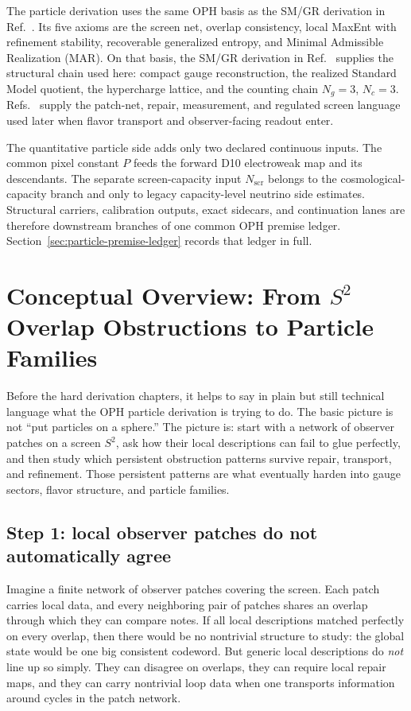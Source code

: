 \documentclass[11pt]{article}
\begin{document}
The particle derivation uses the same OPH basis as the SM/GR derivation in Ref.~\cite{ophcompact}. Its five
axioms are the screen net, overlap consistency, local MaxEnt with refinement stability,
recoverable generalized entropy, and Minimal Admissible Realization (MAR). On that basis, the
SM/GR derivation in Ref.~\cite{ophcompact} supplies the structural chain used here: compact gauge reconstruction, the realized
Standard Model quotient, the hypercharge lattice, and the counting chain \(N_g=3\), \(N_c=3\).
Refs.~\cite{ophconsensus,ophmicrophysics} supply the patch-net, repair, measurement, and
regulated screen language used later when flavor transport and observer-facing readout enter.

The quantitative particle side adds only two declared continuous inputs. The common pixel constant
\(P\) feeds the forward D10 electroweak map and its descendants. The separate screen-capacity
input \(N_{\mathrm{scr}}\) belongs to the cosmological-capacity branch and only to legacy
capacity-level neutrino side estimates. Structural carriers, calibration outputs, exact sidecars, and continuation
lanes are therefore downstream branches of one common OPH premise ledger. Section~\ref{sec:particle-premise-ledger}
records that ledger in full.

\section{Conceptual Overview: From \texorpdfstring{$S^2$}{S2} Overlap Obstructions to Particle Families}

Before the hard derivation chapters, it helps to say in plain but still technical language what
the OPH particle derivation is trying to do. The basic picture is not ``put particles on a
sphere.'' The picture is: start with a network of observer patches on a screen \(S^2\), ask how
their local descriptions can fail to glue perfectly, and then study which persistent obstruction
patterns survive repair, transport, and refinement. Those persistent patterns
are what eventually harden into gauge sectors, flavor structure, and particle families.

\subsection{Step 1: local observer patches do not automatically agree}

Imagine a finite network of observer patches covering the screen. Each patch carries local data,
and every neighboring pair of patches shares an overlap through which they can compare notes. If
all local descriptions matched perfectly on every overlap, then there would be no nontrivial
structure to study: the global state would be one big consistent codeword. But generic local
descriptions do \emph{not} line up so simply. They can disagree on overlaps, they can require
local repair maps, and they can carry nontrivial loop data when one transports information around
cycles in the patch network.
\end{document}
